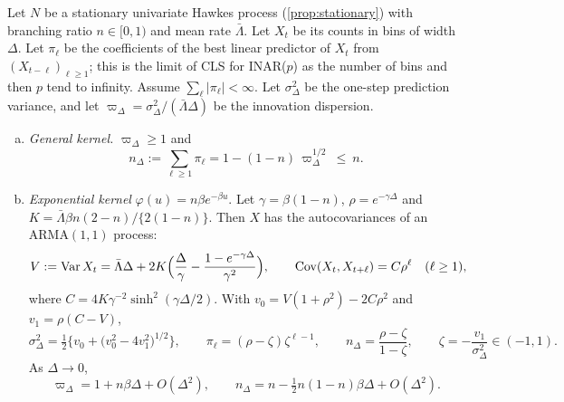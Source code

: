 \begin{proposition}\label{prop:est-binning}
Let $N$ be a stationary univariate Hawkes process (\cref{prop:stationary}) with branching
ratio $n\in[0,1)$ and mean rate $\bar\Lambda$. Let $X_t$ be its counts in bins of width
$\Delta$. Let $\pi_\ell$ be the coefficients of the best linear predictor of $X_t$ from
$(X_{t-\ell})_{\ell\ge1}$; this is the limit of CLS for INAR($p$) as the number of bins and
then $p$ tend to infinity. Assume $\sum_\ell|\pi_\ell|<\infty$. Let $\sigma^2_\Delta$ be the
one-step prediction variance, and let $\varpi_\Delta=\sigma^2_\Delta/(\bar\Lambda\Delta)$
be the innovation dispersion.
\begin{enumerate}[(a)]
  \item \emph{General kernel.} $\varpi_\Delta\ge1$ and
    \[
      n_\Delta:=\sum_{\ell\ge1}\pi_\ell=1-(1-n)\,\varpi_\Delta^{1/2}\ \le\ n .
    \]
  \item \emph{Exponential kernel} $\varphi(u)=n\beta e^{-\beta u}$. Let $\gamma=\beta(1-n)$,
    $\rho=e^{-\gamma\Delta}$ and $K=\bar\Lambda\beta n(2-n)/\{2(1-n)\}$. Then $X$ has the
    autocovariances of an ARMA$(1,1)$ process:
    \[
      V:=\operatorname{Var} X_t=\bar\Lambda\Delta+2K\Big(\frac{\Delta}{\gamma}-\frac{1-e^{-\gamma\Delta}}{\gamma^2}\Big),
      \qquad
      \operatorname{Cov}(X_t,X_{t+\ell})=C\rho^{\ell}\quad(\ell\ge1),
    \]
    where $C=4K\gamma^{-2}\sinh^2(\gamma\Delta/2)$.
    With $v_0=V(1+\rho^2)-2C\rho^2$ and $v_1=\rho(C-V)$,
    \[
      \sigma^2_\Delta=\tfrac12\Big\{v_0+\big(v_0^2-4v_1^2\big)^{1/2}\Big\},\qquad
      \pi_\ell=(\rho-\zeta)\zeta^{\ell-1},\qquad
      n_\Delta=\frac{\rho-\zeta}{1-\zeta},\qquad
      \zeta=-\frac{v_1}{\sigma^2_\Delta}\in(-1,1).
    \]
    As $\Delta\to0$,
    \[
      \varpi_\Delta=1+n\beta\Delta+O(\Delta^2),\qquad
      n_\Delta=n-\tfrac12n(1-n)\beta\Delta+O(\Delta^2).
    \]
\end{enumerate}
\end{proposition}

